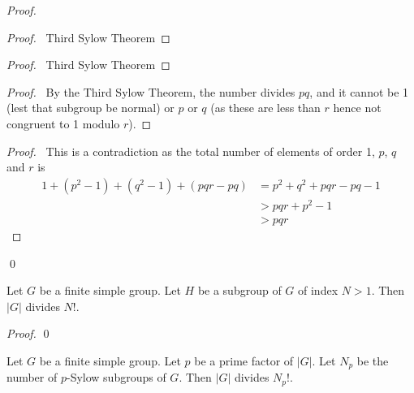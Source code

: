 \begin{proof}
\pf
{}
\begin{proof}
	\pf\ Third Sylow Theorem
\end{proof}
\begin{proof}
	\pf\ Third Sylow Theorem
\end{proof}
\begin{proof}
	\pf\ By the Third Sylow Theorem, the number divides $pq$, and it cannot be 1 (lest that subgroup be normal) or $p$ or $q$ (as these are less than $r$ hence not congruent to 1 modulo $r$).
\end{proof}
\qedstep
\begin{proof}
	\pf\ This is a contradiction as the total number of elements of order 1, $p$, $q$ and $r$ is
	\begin{align*}
		1 + (p^2 - 1) + (q^2 - 1) + (pqr - pq)
		& = p^2 + q^2 + pqr - pq - 1 \\
		& > pqr + p^2 - 1 \\
		& > pqr
	\end{align*}
\end{proof}
\qed
\end{proof}

\begin{prop}
Let $G$ be a finite simple group. Let $H$ be a subgroup of $G$ of index $N > 1$. Then $|G|$ divides $N!$.
\end{prop}

\begin{proof}
\pf
{}
\qed
\end{proof}

\begin{cor}
\label{cor:G-divides-Npfac}
Let $G$ be a finite simple group. Let $p$ be a prime factor of $|G|$.
Let $N_p$ be the number of $p$-Sylow subgroups of $G$. Then $|G|$ divides $N_p!$.
\end{cor}

